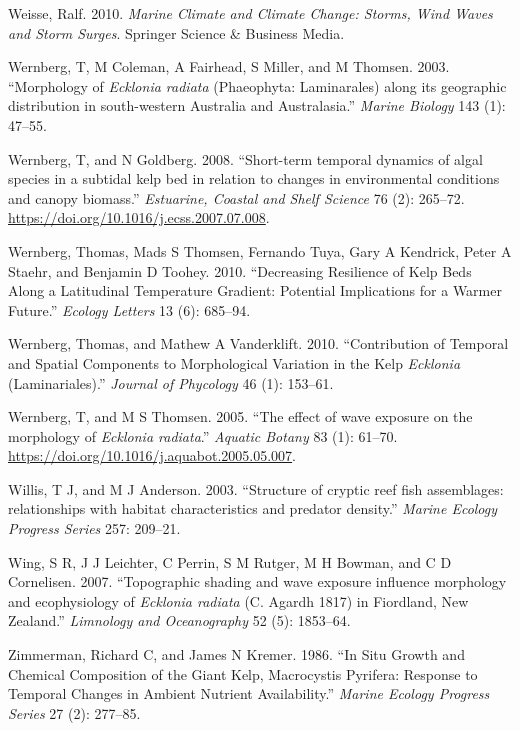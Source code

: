 \documentclass[
  a4paper,
]{article}
\begin{document}
\leavevmode\hypertarget{ref-Weisse2010}{}%
Weisse, Ralf. 2010. \emph{Marine Climate and Climate Change: Storms,
Wind Waves and Storm Surges}. Springer Science \& Business Media.

\leavevmode\hypertarget{ref-Wernberg2003-mp}{}%
Wernberg, T, M Coleman, A Fairhead, S Miller, and M Thomsen. 2003.
``Morphology of \emph{Ecklonia radiata} (Phaeophyta: Laminarales) along
its geographic distribution in south-western Australia and
Australasia.'' \emph{Marine Biology} 143 (1): 47--55.

\leavevmode\hypertarget{ref-Wernberg2008}{}%
Wernberg, T, and N Goldberg. 2008. ``Short-term temporal dynamics of
algal species in a subtidal kelp bed in relation to changes in
environmental conditions and canopy biomass.'' \emph{Estuarine, Coastal
and Shelf Science} 76 (2): 265--72.
\url{https://doi.org/10.1016/j.ecss.2007.07.008}.

\leavevmode\hypertarget{ref-Wernberg2010b}{}%
Wernberg, Thomas, Mads S Thomsen, Fernando Tuya, Gary A Kendrick, Peter
A Staehr, and Benjamin D Toohey. 2010. ``Decreasing Resilience of Kelp
Beds Along a Latitudinal Temperature Gradient: Potential Implications
for a Warmer Future.'' \emph{Ecology Letters} 13 (6): 685--94.

\leavevmode\hypertarget{ref-Wernberg2010a}{}%
Wernberg, Thomas, and Mathew A Vanderklift. 2010. ``Contribution of
Temporal and Spatial Components to Morphological Variation in the Kelp
\emph{Ecklonia} (Laminariales).'' \emph{Journal of Phycology} 46 (1):
153--61.

\leavevmode\hypertarget{ref-Wernberg2005c}{}%
Wernberg, T, and M S Thomsen. 2005. ``The effect of wave exposure on the
morphology of \emph{Ecklonia radiata}.'' \emph{Aquatic Botany} 83 (1):
61--70. \url{https://doi.org/10.1016/j.aquabot.2005.05.007}.

\leavevmode\hypertarget{ref-Willis2003-xo}{}%
Willis, T J, and M J Anderson. 2003. ``Structure of cryptic reef fish
assemblages: relationships with habitat characteristics and predator
density.'' \emph{Marine Ecology Progress Series} 257: 209--21.

\leavevmode\hypertarget{ref-Wing2007-tv}{}%
Wing, S R, J J Leichter, C Perrin, S M Rutger, M H Bowman, and C D
Cornelisen. 2007. ``Topographic shading and wave exposure influence
morphology and ecophysiology of \emph{Ecklonia radiata} (C. Agardh 1817)
in Fiordland, New Zealand.'' \emph{Limnology and Oceanography} 52 (5):
1853--64.

\leavevmode\hypertarget{ref-zimmerman1986}{}%
Zimmerman, Richard C, and James N Kremer. 1986. ``In Situ Growth and
Chemical Composition of the Giant Kelp, Macrocystis Pyrifera: Response
to Temporal Changes in Ambient Nutrient Availability.'' \emph{Marine
Ecology Progress Series} 27 (2): 277--85.
\end{document}
